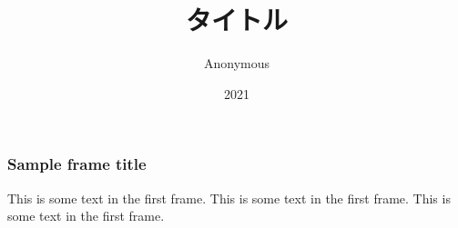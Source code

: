\documentclass{beamer}
\title{タイトル}
\author{Anonymous}
\institute{Overleaf}
\date{2021}
\begin{document}
\frame{\titlepage}

\begin{frame}
\frametitle{Sample frame title}
This is some text in the first frame. This is some text in the first frame. This is some text in the first frame.
\end{frame}
\end{document}
